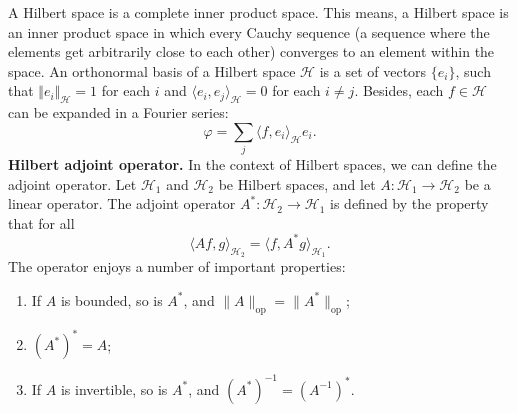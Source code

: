 \documentclass[
  12pt]{article}
\def\to{\rightarrow}
\def\cH{\mathcal{H}}
\begin{document}
A Hilbert space is a complete inner product space. This means, a Hilbert space is an inner product space in which every Cauchy sequence (a sequence where the elements get arbitrarily close to each other) converges to an element within the space. An orthonormal basis of a Hilbert space $\cH$ is a set of vectors $\{e_i\}$, such that $\Vert e_i \Vert_\cH = 1$ for each $i$ and $\langle e_i, e_j \rangle_\cH = 0$ for each $i \neq j$. Besides, each $f\in\cH$ can be expanded in a Fourier series:
$$
\varphi=\sum_{j}\langle f,e_i\rangle_{\mathcal{H}}e_i.
$$
\textbf{Hilbert adjoint operator.} In the context of Hilbert spaces, we can define the adjoint operator. Let $\cH_1$ and $\cH_2$ be Hilbert spaces, and let $A:\cH_1\to \cH_2$ be a linear operator. The adjoint operator $A^*:\cH_2\to \cH_1$ is defined by the property that for all
$$
\langle Af,g\rangle_{\mathcal{H}_2}=\langle f,A^*g\rangle_{\mathcal{H}_1}.
$$
The operator enjoys a number of important properties:
\begin{enumerate}
    \item If $A$ is bounded, so is $A^*$, and $\|A\|_{\mathrm{op}}=\|A^*\|_{\mathrm{op}}$;
    \item $(A^*)^*=A$;
    \item If $A$ is invertible, so is $A^*$, and $(A^{*})^{-1}=(A^{-1})^{*}$.
\end{enumerate}
\end{document}
